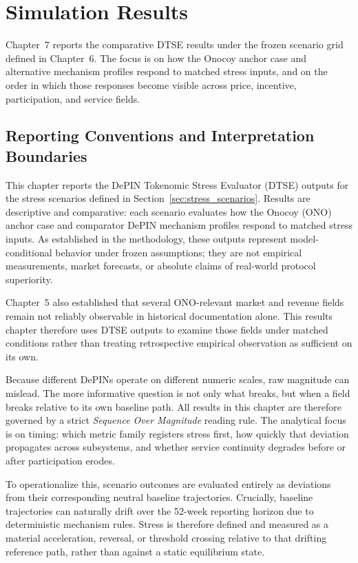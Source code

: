\section{Simulation Results}
\label{sec:simulation_results}

Chapter~7 reports the comparative DTSE results under the frozen scenario grid defined in Chapter~6. The focus is on how the Onocoy anchor case and alternative mechanism profiles respond to matched stress inputs, and on the order in which those responses become visible across price, incentive, participation, and service fields.

\subsection{Reporting Conventions and Interpretation Boundaries}
\label{subsec:results_reporting_conventions}
This chapter reports the DePIN Tokenomic Stress Evaluator (DTSE) outputs for the stress scenarios defined in Section~\ref{sec:stress_scenarios}. Results are descriptive and comparative: each scenario evaluates how the Onocoy (ONO) anchor case and comparator DePIN mechanism profiles respond to matched stress inputs. As established in the methodology, these outputs represent model-conditional behavior under frozen assumptions; they are not empirical measurements, market forecasts, or absolute claims of real-world protocol superiority.

Chapter~5 also established that several ONO-relevant market and revenue fields remain not reliably observable in historical documentation alone. This results chapter therefore uses DTSE outputs to examine those fields under matched conditions rather than treating retrospective empirical observation as sufficient on its own.

Because different DePINs operate on different numeric scales, raw magnitude can mislead. The more informative question is not only what breaks, but when a field breaks relative to its own baseline path. All results in this chapter are therefore governed by a strict \emph{Sequence Over Magnitude} reading rule. The analytical focus is on timing: which metric family registers stress first, how quickly that deviation propagates across subsystems, and whether service continuity degrades before or after participation erodes.

To operationalize this, scenario outcomes are evaluated entirely as deviations from their corresponding neutral baseline trajectories. Crucially, baseline trajectories can naturally drift over the 52-week reporting horizon due to deterministic mechanism rules. Stress is therefore defined and measured as a material acceleration, reversal, or threshold crossing relative to that drifting reference path, rather than against a static equilibrium state.

